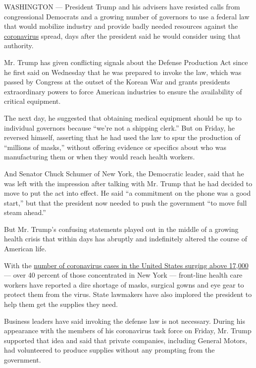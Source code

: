 WASHINGTON --- President Trump and his advisers have resisted calls from
congressional Democrats and a growing number of governors to use a
federal law that would mobilize industry and provide badly needed
resources against the
\href{https://www.nytimes.com/2020/03/20/world/coronavirus-news.html}{coronavirus}
spread, days after the president said he would consider using that
authority.

Mr. Trump has given conflicting signals about the Defense Production Act
since he first said on Wednesday that he was prepared to invoke the law,
which was passed by Congress at the outset of the Korean War and grants
presidents extraordinary powers to force American industries to ensure
the availability of critical equipment.

The next day, he suggested that obtaining medical equipment should be up
to individual governors because ``we're not a shipping clerk.'' But on
Friday, he reversed himself, asserting that he had used the law to spur
the production of ``millions of masks,'' without offering evidence or
specifics about who was manufacturing them or when they would reach
health workers.

And Senator Chuck Schumer of New York, the Democratic leader, said that
he was left with the impression after talking with Mr. Trump that he had
decided to move to put the act into effect. He said ``a commitment on
the phone was a good start,'' but that the president now needed to push
the government ``to move full steam ahead.''

But Mr. Trump's confusing statements played out in the middle of a
growing health crisis that within days has abruptly and indefinitely
altered the course of American life.

With the
\href{https://www.nytimes.com/interactive/2020/world/coronavirus-maps.html\#us}{number
of coronavirus cases in the United States surging above 17,000} --- over
40 percent of those concentrated in New York --- front-line health care
workers have reported a dire shortage of masks, surgical gowns and eye
gear to protect them from the virus. State lawmakers have also implored
the president to help them get the supplies they need.

Business leaders have said invoking the defense law is not necessary.
During his appearance with the members of his coronavirus task force on
Friday, Mr. Trump supported that idea and said that private companies,
including General Motors, had volunteered to produce supplies without
any prompting from the government.

